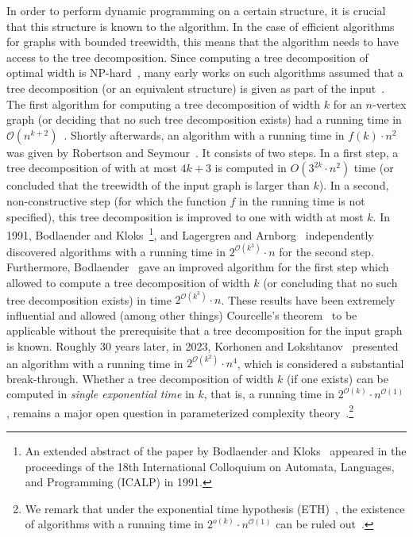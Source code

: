 \documentclass[a4paper,UKenglish,cleveref, autoref, thm-restate, numberwithinsect]{lipics-v2021}
\newcounter{algorithm}
\newcommand{\OO}{\mathcal{O}}
\begin{document}
In order to perform dynamic programming on a certain structure, it is crucial that this structure is known to the algorithm. In the case of efficient algorithms for graphs with bounded treewidth, this means that the algorithm needs to have access to the tree decomposition. Since computing a tree decomposition of optimal width is NP-hard~\cite{arnborg1987complexity}, many early works on such algorithms assumed that a tree decomposition (or an equivalent structure) is given as part of the input~\cite{arnborg1985efficient,arnborg1989linear,bern1987linear}. The first algorithm for computing a tree decomposition of width $k$ for an $n$-vertex graph (or deciding that no such tree decomposition exists) had a running time in $\OO(n^{k+2})$~\cite{arnborg1987complexity}. 
Shortly afterwards, an algorithm with a running time in $f(k)\cdot n^2$ was given by Robertson and Seymour~\cite{robertson1995graph}. It consists of two steps. In a first step, a tree decomposition of with at most $4k+3$ is computed in $O(3^{2k}\cdot n^2)$ time (or concluded that the treewidth of the input graph is larger than $k$). In a second, non-constructive step (for which the function $f$ in the running time is not specified), this tree decomposition is improved to one with width at most $k$.
In 1991, Bodlaender and Kloks~\cite{bodlaender1996efficient}\footnote{An extended abstract of the paper by Bodlaender and Kloks~\cite{bodlaender1996efficient} appeared in the proceedings of the 18th International Colloquium on Automata, Languages, and Programming (ICALP) in 1991.}, and Lagergren and Arnborg~\cite{lagergren1991finding} independently discovered algorithms with a running time in $2^{\OO(k^3)}\cdot n$ for the second step. Furthermore, Bodlaender~\cite{bodlaender1996linear} gave an improved algorithm for the first step which allowed to compute a tree decomposition of width $k$ (or concluding that no such tree decomposition exists) in time $2^{\OO(k^3)}\cdot n$.
These results have been extremely influential and allowed (among other things) 
Courcelle's theorem~\cite{borie1992automatic,courcelle1990monadic,courcelle2012graph} to be applicable without the prerequisite that a tree decomposition for the input graph is known.
Roughly 30 years later, in 2023, Korhonen and Lokshtanov~\cite{korhonen2023improved} presented an algorithm with a running time in $2^{\OO(k^2)}\cdot n^4$, which is considered a substantial break-through. Whether a tree decomposition of width $k$ (if one exists) can be computed in \emph{single exponential time} in $k$, that is, a running time in $2^{\OO(k)}\cdot n^{\OO(1)}$, remains a major open question in parameterized complexity theory~\cite{korhonen2023improved}.\footnote{We remark that under the exponential time hypothesis (ETH)~\cite{IP01,IPZ01}, the existence of algorithms with a running time in $2^{o({k})}\cdot n^{\OO(1)}$ can be ruled out~\cite{bonnet25}.}
\end{document}
